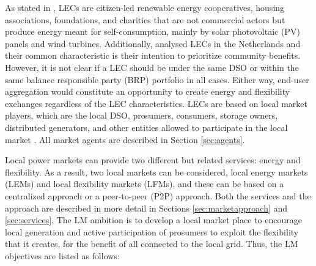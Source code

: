 As stated in \cite{sajn2016electricity}, LECs are citizen-led renewable energy cooperatives, housing associations, foundations, and charities that are not commercial actors but produce energy meant for self-consumption, mainly by solar photovoltaic (PV) panels and wind turbines. Additionally, \cite{van2015power} analysed LECs in the Netherlands and their common characteristic is their intention to prioritize community benefits. However, it is not clear if a LEC should be under the same DSO or within the same balance responsible party (BRP) portfolio in all cases. Either way, end-user aggregation would constitute an opportunity to create energy and flexibility exchanges regardless of the LEC characteristics. LECs are based on local market players, which are the local DSO, prosumers, consumers, storage owners, distributed generators, and other entities allowed to participate in the local market \cite{faber2014micro}. All market agents are described in Section \ref{sec:agents}.

Local power markets can provide two different but related services: energy and flexibility. As a result, two local markets can be considered, local energy markets (LEMs) and local flexibility markets (LFMs), and these can be based on a centralized approach or a peer-to-peer (P2P) approach. Both the services and the approach are described in more detail in Sections \ref{sec:marketapproach} and \ref{sec:services}. The LM ambition is to develop a local market place to encourage local generation and active participation of prosumers to exploit the flexibility that it creates, for the benefit of all connected to the local grid. Thus, the LM objectives are listed as follows:

